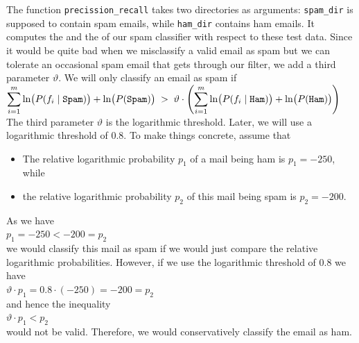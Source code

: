 The function \texttt{precission\_recall} takes two directories as arguments: \texttt{spam\_dir} is supposed to contain spam emails, while \texttt{ham\_dir} contains ham emails.  It computes the  and the  of our spam classifier with respect to these test data.
Since it would be quite bad when we misclassify a valid email as spam but we can tolerate an occasional spam email that gets through our filter, we add a third parameter $\vartheta$.  We will only classify an email as spam if
\\[0.2cm]
\hspace*{1.3cm}
$\displaystyle \sum\limits_{i=1}^m \ln\bigl(P(f_i \;|\; \mathtt{Spam})\bigr) + \ln\bigl(P(\mathtt{Spam})\bigr) \; > \;
\vartheta \cdot \left( \sum\limits_{i=1}^m \ln\bigl(P(f_i \;|\; \mathtt{Ham})\bigr) + \ln\bigl(P(\mathtt{Ham}) \bigr) \right)
$
\\[0.2cm]
The third parameter $\vartheta$ is the logarithmic threshold. Later, we will use a logarithmic threshold of $0.8$.
To make things concrete, assume that
\begin{itemize}
\item The relative logarithmic probability $p_1$ of a mail being ham is $p_1 = -250$, while
\item the relative logarithmic probability $p_2$ of this mail being spam is $p_2 = -200$.
\end{itemize}
As we have
\\[0.2cm]
\hspace*{1.3cm}
$p_1 = -250 < -200 = p_2$
\\[0.2cm]
we would classify this mail as spam if we would just compare the relative logarithmic probabilities.
However, if we use the logarithmic threshold of $0.8$ we have
\\[0.2cm]
\hspace*{1.3cm}
$\vartheta \cdot p_1 = 0.8 \cdot (-250) = -200 = p_2 $
\\[0.2cm]
and hence the inequality
\\[0.2cm]
\hspace*{1.3cm}
$\vartheta \cdot p_1 < p_2$
\\[0.2cm]
would not be valid.  Therefore, we would conservatively classify the email as ham.

